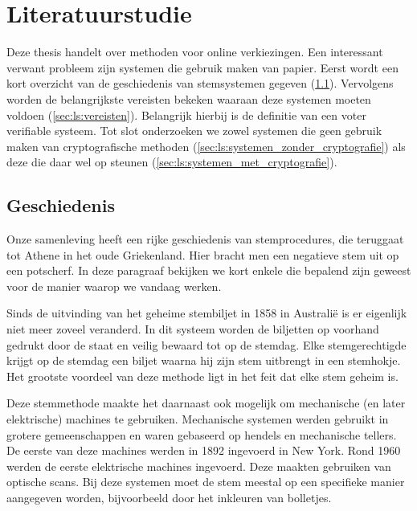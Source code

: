 % 
%

\chapter{Literatuurstudie}
\label{chap:literatuurstudie}

Deze thesis handelt over methoden voor online verkiezingen. Een interessant verwant probleem zijn systemen die gebruik maken van papier. Eerst wordt een kort overzicht van de geschiedenis van stemsystemen gegeven (\ref{sec:ls:geschiedenis}). Vervolgens worden de belangrijkste vereisten bekeken waaraan deze systemen moeten voldoen (\ref{sec:ls:vereisten}). Belangrijk hierbij is de definitie van een voter verifiable systeem. Tot slot onderzoeken we zowel systemen die geen gebruik maken van cryptografische methoden (\ref{sec:ls:systemen_zonder_cryptografie}) als deze die daar wel op steunen (\ref{sec:ls:systemen_met_cryptografie}).

\section{Geschiedenis~\cite{adida_advances_in_cryptographic_voting_systems}}
\label{sec:ls:geschiedenis}

Onze samenleving heeft een rijke geschiedenis van stemprocedures, die teruggaat tot Athene in het oude Griekenland. Hier bracht men een negatieve stem uit op een potscherf. In deze paragraaf bekijken we kort enkele die bepalend zijn geweest voor de manier waarop we vandaag werken.\cite{wiki:ostracon}

\npar Sinds de uitvinding van het geheime stembiljet in 1858 in Australi\"e is er eigenlijk niet meer zoveel veranderd. In dit systeem worden de biljetten op voorhand gedrukt door de staat en veilig bewaard tot op de stemdag. Elke stemgerechtigde krijgt op de stemdag een biljet waarna hij zijn stem uitbrengt in een stemhokje. Het grootste voordeel van deze methode ligt in het feit dat elke stem geheim is.

\npar Deze stemmethode maakte het daarnaast ook mogelijk om mechanische (en later elektrische) machines te gebruiken. Mechanische systemen werden gebruikt in grotere gemeenschappen en waren gebaseerd op hendels en mechanische tellers. De eerste van deze machines werden in 1892 ingevoerd in New York. Rond 1960 werden de eerste elektrische machines ingevoerd. Deze maakten gebruiken van optische scans. Bij deze systemen moet de stem meestal op een specifieke manier aangegeven worden, bijvoorbeeld door het inkleuren van bolletjes.

